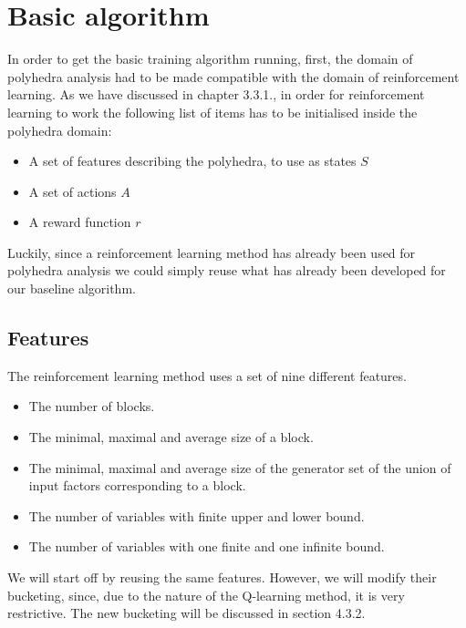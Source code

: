 \section{Basic algorithm}
In order to get the basic training algorithm running, first, the domain of polyhedra analysis had to be made compatible with the domain of reinforcement learning. As we have discussed in chapter 3.3.1., in order for reinforcement learning to work the following list of items has to be initialised inside the polyhedra domain:
\begin{itemize}
    \item A set of features describing the polyhedra, to use as states $S$
    \item A set of actions $A$
    \item A reward function $r$
\end{itemize}
Luckily, since a reinforcement learning method \cite{singh2018fast} has already been used for polyhedra analysis we could simply reuse what has already been developed for our baseline algorithm.\\
\subsection{Features}
The reinforcement learning method uses a set of nine different features.
\begin{itemize}
    \item The number of blocks.
    \item The minimal, maximal and average size of a block.
    \item The minimal, maximal and average size of the generator set of the union of input factors corresponding to a block.
    \item The number of variables with finite upper and lower bound.
    \item The number of variables with one finite and one infinite bound.
\end{itemize}
We will start off by reusing the same features. However, we will modify their bucketing, since, due to the nature of the Q-learning method, it is very restrictive. The new bucketing will be discussed in section 4.3.2.

